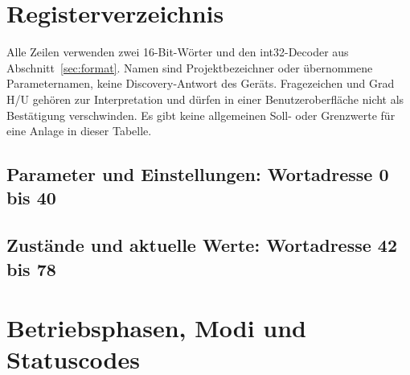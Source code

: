 \documentclass[10pt,a4paper]{article}
\begin{document}

\section{Registerverzeichnis}
\label{sec:registers}
Alle Zeilen verwenden zwei 16-Bit-Wörter und den int32-Decoder aus Abschnitt~\ref{sec:format}. Namen sind Projektbezeichner oder übernommene Parameternamen, keine Discovery-Antwort des Geräts. Fragezeichen und Grad H/U gehören zur Interpretation und dürfen in einer Benutzeroberfläche nicht als Bestätigung verschwinden. Es gibt keine allgemeinen Soll- oder Grenzwerte für eine Anlage in dieser Tabelle.

\subsection{Parameter und Einstellungen: Wortadresse 0 bis 40}


\subsection{Zustände und aktuelle Werte: Wortadresse 42 bis 78}


\section{Betriebsphasen, Modi und Statuscodes}
\label{sec:states}
\end{document}

